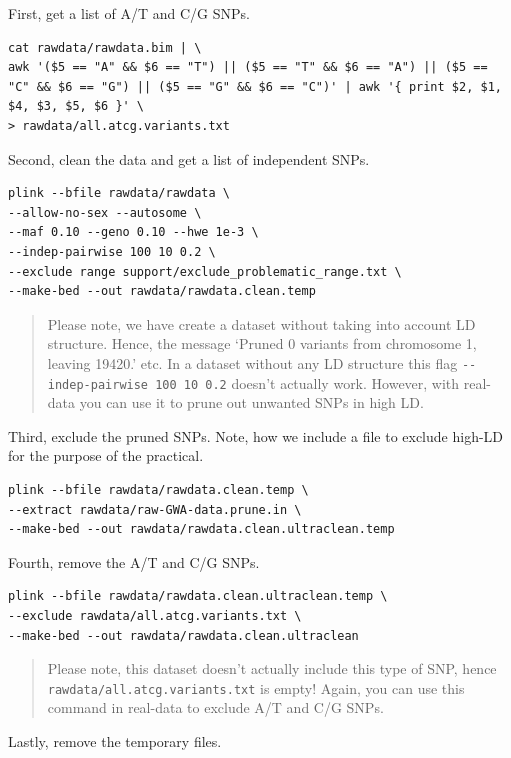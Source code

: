 \documentclass[
]{book}
\begin{document}
First, get a list of A/T and C/G SNPs.

\begin{verbatim}
cat rawdata/rawdata.bim | \
awk '($5 == "A" && $6 == "T") || ($5 == "T" && $6 == "A") || ($5 == "C" && $6 == "G") || ($5 == "G" && $6 == "C")' | awk '{ print $2, $1, $4, $3, $5, $6 }' \
> rawdata/all.atcg.variants.txt
\end{verbatim}

Second, clean the data and get a list of independent SNPs.

\begin{verbatim}
plink --bfile rawdata/rawdata \
--allow-no-sex --autosome \
--maf 0.10 --geno 0.10 --hwe 1e-3 \
--indep-pairwise 100 10 0.2 \
--exclude range support/exclude_problematic_range.txt \
--make-bed --out rawdata/rawdata.clean.temp
\end{verbatim}

\begin{quote}
Please note, we have create a dataset without taking into account LD structure. Hence, the message `Pruned 0 variants from chromosome 1, leaving 19420.' etc. In a dataset without any LD structure this flag \texttt{-\/-indep-pairwise\ 100\ 10\ 0.2} doesn't actually work. However, with real-data you can use it to prune out unwanted SNPs in high LD.
\end{quote}

Third, exclude the pruned SNPs. Note, how we include a file to exclude high-LD for the purpose of the practical.

\begin{verbatim}
plink --bfile rawdata/rawdata.clean.temp \
--extract rawdata/raw-GWA-data.prune.in \
--make-bed --out rawdata/rawdata.clean.ultraclean.temp
\end{verbatim}

Fourth, remove the A/T and C/G SNPs.

\begin{verbatim}
plink --bfile rawdata/rawdata.clean.ultraclean.temp \
--exclude rawdata/all.atcg.variants.txt \
--make-bed --out rawdata/rawdata.clean.ultraclean
\end{verbatim}

\begin{quote}
Please note, this dataset doesn't actually include this type of SNP, hence \texttt{rawdata/all.atcg.variants.txt} is empty! Again, you can use this command in real-data to exclude A/T and C/G SNPs.
\end{quote}

Lastly, remove the temporary files.
\end{document}
